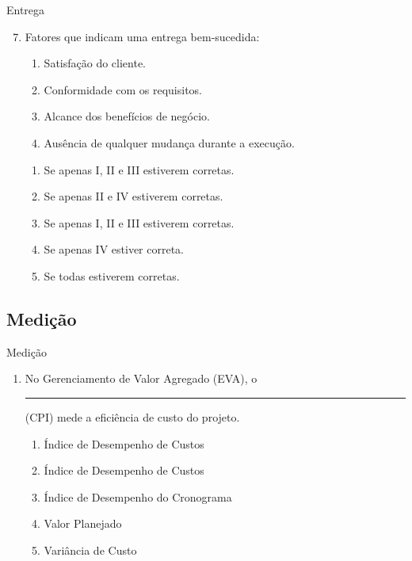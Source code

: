 \documentclass{beamer}
\begin{document}
\begin{frame}{Entrega}
	\begin{enumerate}
		\setcounter{enumi}{6}
		\justifying
		\item Fatores que indicam uma entrega bem-sucedida:
		\begin{enumerate}[I]
			\item Satisfação do cliente.
			\item Conformidade com os requisitos.
			\item Alcance dos benefícios de negócio.
			\item Ausência de qualquer mudança durante a execução.
		\end{enumerate}
		\begin{enumerate}[a]
			\item Se apenas I, II e III estiverem corretas.
			\item Se apenas II e IV estiverem corretas.
			\item \alert<2>{Se apenas I, II e III estiverem corretas.}
			\item Se apenas IV estiver correta.
			\item Se todas estiverem corretas.
		\end{enumerate}
	\end{enumerate}
\end{frame}

\subsection{Medição}

\begin{frame}{Medição}
	\begin{enumerate}
		\justifying
		\item No Gerenciamento de Valor Agregado (EVA), o \rule{70pt}{1pt} (CPI) mede a eficiência de custo do projeto.
		\begin{enumerate}[a]
			\item Índice de Desempenho de Custos
			\item \alert<2>{Índice de Desempenho de Custos}
			\item Índice de Desempenho do Cronograma
			\item Valor Planejado
			\item Variância de Custo
		\end{enumerate}
	\end{enumerate}
\end{frame}
\end{document}
